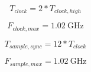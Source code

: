 \documentclass[10pt,journal]{IEEEtran}\usepackage{longtable}
\begin{document}
\begin{equation}
  T_{clock} = 2 * T_{clock,high}
\end{equation}

\begin{equation}
  F_{clock,max} = \SI{1.02}{\giga\hertz}
\end{equation}

\begin{equation}
  T_{sample,sync} = 12 * T_{clock}
\end{equation}

\begin{equation}
  F_{sample,max} = \SI{1.02}{\giga\hertz}
\end{equation}









\end{document}
